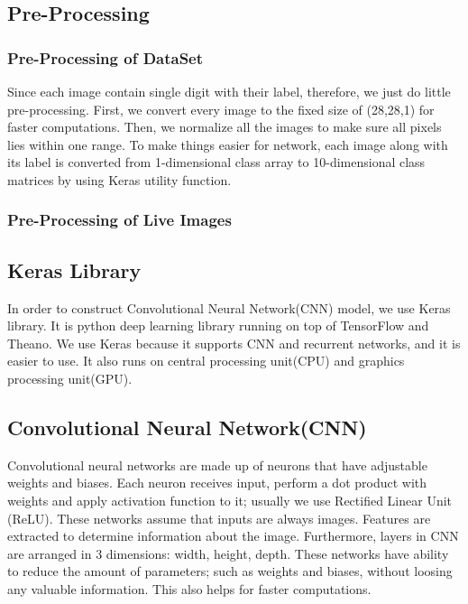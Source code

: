 \documentclass[12pt, letterpaper]{article}
\begin{document}
\subsection{Pre-Processing}

\subsubsection{Pre-Processing of DataSet}

Since each image contain single digit with their label, therefore, we just do little pre-processing. First, we convert every image to the fixed size of (28,28,1) for faster computations. Then, we normalize all the images to make sure all pixels lies within one range. To make things easier for network, each image along with its label is converted from 1-dimensional class array to 10-dimensional class matrices by using Keras utility function.

\subsubsection{Pre-Processing of Live Images} 


\subsection{Keras Library}

In order to construct Convolutional Neural Network(CNN) model, we use Keras library. It is python deep learning library running on top of TensorFlow and Theano. We use Keras because it supports CNN and recurrent networks, and it is easier to use. It also runs on central processing unit(CPU) and graphics processing unit(GPU)\cite{keras}. 


\subsection{Convolutional Neural Network(CNN)}

Convolutional neural networks are made up of neurons that have adjustable weights and biases. Each neuron receives input, perform a dot product with weights and apply activation function to it; usually we use Rectified Linear Unit (ReLU). These networks assume that inputs are always images. Features are extracted to determine information about the image. Furthermore, layers in CNN are arranged in 3 dimensions: width, height, depth. These networks have ability to reduce the amount of parameters; such as weights and biases, without loosing any valuable information. This also helps for faster computations\cite{features_map}\cite{cnn_info}. 
\end{document}
